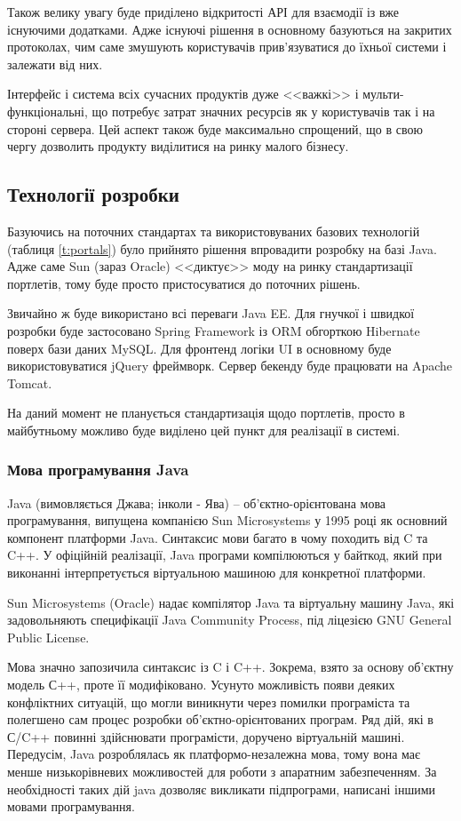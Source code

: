 \par Також велику увагу буде приділено відкритості АРІ для взаємодії із вже існуючими додатками.
Адже існуючі рішення в основному базуються на закритих протоколах, чим саме змушують користувачів прив'язуватися до їхньої системи і залежати від них.
\par Інтерфейс і система всіх сучасних продуктів дуже <<важкі>> і мульти-функціональні, що потребує затрат значних ресурсів як у користувачів так і на стороні сервера.
Цей аспект також буде максимально спрощений, що в свою чергу дозволить продукту виділитися на ринку малого бізнесу.

\subsection{Технології розробки} 
Базуючись на поточних стандартах \cite{portlet2} та використовуваних базових технологій (таблиця \ref{t:portals}) було прийнято рішення впровадити розробку на базі Java.
Адже саме Sun (зараз Oracle) <<диктує>> моду на ринку стандартизації портлетів, тому буде просто пристосуватися до поточних рішень.
\par Звичайно ж буде використано всі переваги Java EE.
Для гнучкої і швидкої розробки буде застосовано Spring Framework із ORM обгорткою Hibernate поверх бази даних MySQL.
Для фронтенд логіки UI в основному буде використовуватися jQuery фреймворк.
Сервер бекенду буде працювати на Apache Tomcat.
\par На даний момент не планується стандартизація щодо портлетів, просто в майбутньому можливо буде виділено цей пункт для реалізації в системі.

\subsubsection{Мова програмування Java}
\par Java (вимовляється Джава; інколи - Ява) -- об'єктно-орієнтована мова програмування, випущена компанією Sun Microsystems у 1995 році як основний компонент платформи Java. Синтаксис мови багато в чому походить від C та C++. У офіційній реалізації, Java програми компілюються у байткод, який при виконанні інтерпретується віртуальною машиною для конкретної платформи.
\par Sun Microsystems (Oracle) надає компілятор Java та віртуальну машину Java, які задовольняють специфікації Java Community Process, під ліцезією GNU General Public License.
\par Мова значно запозичила синтаксис із C і C++. Зокрема, взято за основу об'єктну модель С++, проте її модифіковано. Усунуто можливість появи деяких конфліктних ситуацій, що могли виникнути через помилки програміста та полегшено сам процес розробки об'єктно-орієнтованих програм. Ряд дій, які в С/C++ повинні здійснювати програмісти, доручено віртуальній машині. Передусім, Java розроблялась як платформо-незалежна мова, тому вона має менше низькорівневих можливостей для роботи з апаратним забезпеченням. За необхідності таких дій java дозволяє викликати підпрограми, написані іншими мовами програмування.

